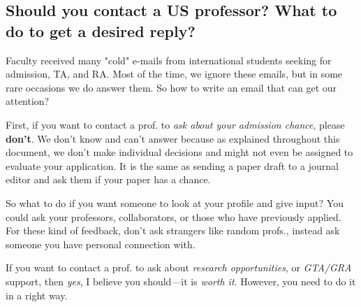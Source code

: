 \documentclass[11pt]{article}
\begin{document}


\subsection{Should you contact a US professor? What to do to get a desired reply?}

Faculty received many "cold" e-mails from international students seeking for admission, TA, and RA. Most of the time, we ignore these emails, but in some rare occasions we do answer them. So how to write an email that can get our attention?

First, if you want to contact a prof. to \emph{ask about your admission chance}, please \textbf{don't}. We don't know and can't answer because as explained throughout this document, we don't make individual decisions and might not even be assigned to evaluate your application.  It is the same as sending a paper draft to a journal editor and ask them if your paper has a chance.  

So what to do if you want someone to look at your profile and give input? You could ask your professors, collaborators, or those who have previously applied. For these kind of feedback,  don't ask strangers like random profs., instead ask someone you have personal connection with.  

If you want to contact a prof. to ask about \emph{research opportunities}, or \emph{GTA/GRA} support, then \emph{yes}, I believe you should---it is \emph{worth it}. However, you need to do it in a right way.
\end{document}
